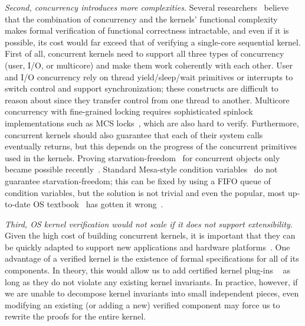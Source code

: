 {\em Second, concurrency introduces more complexities.}
Several
researchers~\cite{vontessin13,peters15} believe that the combination
of concurrency and the kernels' functional complexity makes formal
verification of functional correctness intractable, and even if it is
possible, its cost would far exceed that of verifying a single-core
sequential kernel.
First of all, concurrent kernels need to support all three types of
concurrency (user, I/O, or multicore) and make them work coherently
with each other. User and I/O concurrency rely on thread
yield/sleep/wait primitives or interrupts to switch control and
support synchronization; these constructs are difficult to reason
about since they transfer control from one thread to another.
Multicore concurrency with fine-grained locking requires sophisticated
spinlock implementations such as MCS locks~\cite{mcs91}, which
 are also
hard to verify.
Furthermore, concurrent kernels should also guarantee that each of their
system calls eventually returns, but this depends on the progress of
the concurrent primitives used in the kernels. Proving
starvation-freedom~\cite{Herlihy08book} for concurrent objects only
became possible recently~\cite{lili16}.  Standard Mesa-style condition
variables~\cite{lampson80} do not guarantee starvation-freedom; this
can be fixed by using a FIFO queue of condition variables, but the
solution is not trivial and even the popular, most up-to-date OS
textbook~\cite[Fig.~5.14]{ospp11} has gotten it
wrong~\cite{anderson16}.

{\em Third, OS kernel verification would not scale if it does not 
support extensibility.} Given the high cost of building concurrent kernels, it is
important that they can be quickly adapted to support new applications
and hardware platforms~\cite{bershad95,engler95,hunt07,unikernel13}. One advantage of a verified
kernel is the existence of formal specifications for all of its
components. In theory, this would allow us to add certified
kernel plug-ins
~\cite{shao10:ctos} 
as long as they do not violate any existing kernel invariants. In
practice, however, if we are unable to decompose kernel invariants
into small independent pieces, even modifying an existing (or adding a
new) verified component may force us to rewrite the proofs for the
entire kernel.


